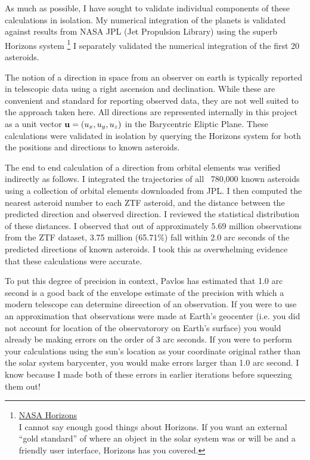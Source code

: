 As much as possible, I have sought to validate individual components of these calculations in isolation.
My numerical integration of the planets is validated against results from NASA JPL (Jet Propulsion Library)
using the superb Horizons system
\footnote{
\href{https://ssd.jpl.nasa.gov/horizons.cgi}{NASA Horizons} \\
I cannot say enough good things about Horizons.
If you want an external ``gold standard'' of where an object in the solar system was or will be 
and a friendly user interface, Horizons has you covered.}
I separately validated the numerical integration of the first 20 asteroids. \\

The notion of a direction in space from an observer on earth is typically reported in telescopic data using a right ascension and declination.
While these are convenient and standard for reporting observed data, they are not well suited to the approach taken here.
All directions are represented internally in this project as a unit vector $\mathbf{u} = (u_x, u_y, u_z)$ in the Barycentric Eliptic Plane.
These calculations were validated in isolation by querying the Horizons system for both the positions and directions to known asteroids.

The end to end calculation of a direction from orbital elements was verified indirectly as follows.
I integrated the trajectories of all ~780,000 known asteroids using a collection of orbital elements downloaded from JPL.
I then computed the nearest asteroid number to each ZTF asteroid, and the distance between the predicted direction and observed direction.
I reviewed the statistical distribution of these distances.
I observed that out of approximately 5.69 million observations from the ZTF dataset,
3.75 million (65.71\%) fall within 2.0 arc seconds of the predicted directions of known asteroids.
I took this as overwhelming evidence that these calculations were accurate.

To put this degree of precision in context, Pavlos has estimated that 1.0 arc second is a good back of the envelope estimate of the 
precision with which a modern telescope can determine direection of an observation.
If you were to use an approximation that observations were made at Earth's geocenter 
(i.e. you did not account for location of the observatorory on Earth's surface) 
you would already be making errors on the order of 3 arc seconds.
If you were to perform your calculations using the sun's location as your coordinate original rather than the solar system barycenter,
you would make errors larger than 1.0 arc second.
I know because I made both of these errors in earlier iterations before squeezing them out!

